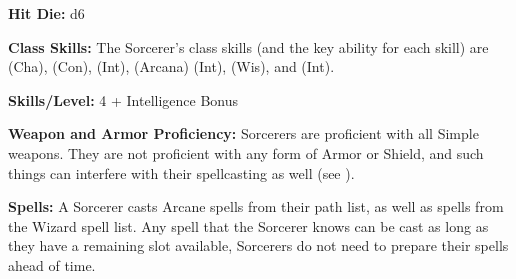 \textbf{Hit Die:} d6

\textbf{Class Skills:} The Sorcerer's class skills (and the key ability for each skill) are  (Cha),  (Con),  (Int),  (Arcana) (Int),  (Wis), and  (Int).

\textbf{Skills/Level:} 4 + Intelligence Bonus

\poorbab{}
\poorfor{}
\poorref{}
\goodwil{}

\begin{fullcastingclasstable}
\end{fullcastingclasstable}

\classfeatures

\textbf{Weapon and Armor Proficiency:} Sorcerers are proficient with all Simple weapons. They are not proficient with any form of Armor or Shield, and such things can interfere with their spellcasting as well (see ).

\textbf{Spells:} A Sorcerer casts Arcane spells from their path list, as well as spells from the Wizard spell list. Any spell that the Sorcerer knows can be cast as long as they have a remaining slot available, Sorcerers do not need to prepare their spells ahead of time.

